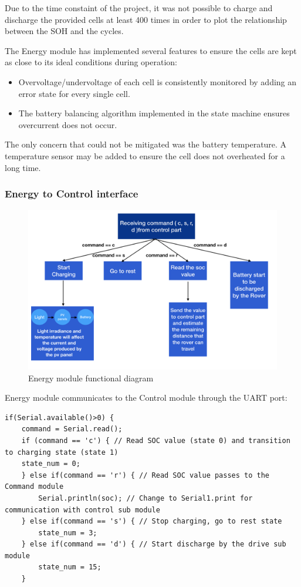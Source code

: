 \documentclass[11pt, a4paper]{article}
\begin{document}
Due to the time constaint of the project, it was not possible to charge and discharge the provided cells at least 400 times in order to plot the relationship between the SOH and the cycles. 

The Energy module has implemented several features to ensure the cells are kept as close to its ideal conditions during operation:
\begin{itemize}
    \item Overvoltage/undervoltage of each cell is consistently monitored by adding an error state for every single cell.
    \item The battery balancing algorithm implemented in the state machine ensures overcurrent does not occur.
\end{itemize}

The only concern that could not be mitigated was the battery temperature. A temperature sensor may be added to ensure the cell does not overheated for a long time.  

\pagebreak
\subsubsection{Energy to Control interface}

\begin{figure} [h!]
    \centering
    \includegraphics[scale=0.25]{Energy_functional.PNG}
    \caption{Energy module functional diagram}
\end{figure}

Energy module communicates to the Control module through the UART port:

\begin{lstlisting}
if(Serial.available()>0) {
    command = Serial.read();
    if (command == 'c') { // Read SOC value (state 0) and transition to charging state (state 1)
    state_num = 0;
    } else if(command == 'r') { // Read SOC value passes to the Command module
        Serial.println(soc); // Change to Serial1.print for communication with control sub module
    } else if(command == 's') { // Stop charging, go to rest state
        state_num = 3;
    } else if(command == 'd') { // Start discharge by the drive sub module
        state_num = 15;
    }
\end{lstlisting}
\end{document}
